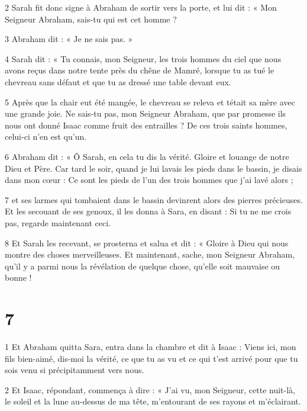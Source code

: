 \par 2 Sarah fit donc signe à Abraham de sortir vers la porte, et lui dit : « Mon Seigneur Abraham, sais-tu qui est cet homme ?

\par 3 Abraham dit : « Je ne sais pas. »

\par 4 Sarah dit : « Tu connais, mon Seigneur, les trois hommes du ciel que nous avons reçus dans notre tente près du chêne de Mamré, lorsque tu as tué le chevreau sans défaut et que tu as dressé une table devant eux.

\par 5 Après que la chair eut été mangée, le chevreau se releva et tétait sa mère avec une grande joie. Ne sais-tu pas, mon Seigneur Abraham, que par promesse ils nous ont donné Isaac comme fruit des entrailles ? De ces trois saints hommes, celui-ci n’en est qu’un.

\par 6 Abraham dit : « Ô Sarah, en cela tu dis la vérité. Gloire et louange de notre Dieu et Père. Car tard le soir, quand je lui lavais les pieds dans le bassin, je disais dans mon cœur : Ce sont les pieds de l'un des trois hommes que j'ai lavé alors ;

\par 7 et ses larmes qui tombaient dans le bassin devinrent alors des pierres précieuses. Et les secouant de ses genoux, il les donna à Sara, en disant : Si tu ne me crois pas, regarde maintenant ceci.

\par 8 Et Sarah les recevant, se prosterna et salua et dit : « Gloire à Dieu qui nous montre des choses merveilleuses. Et maintenant, sache, mon Seigneur Abraham, qu'il y a parmi nous la révélation de quelque chose, qu'elle soit mauvaise ou bonne !


\chapter{7}

\par 1 Et Abraham quitta Sara, entra dans la chambre et dit à Isaac : Viens ici, mon fils bien-aimé, dis-moi la vérité, ce que tu as vu et ce qui t'est arrivé pour que tu sois venu si précipitamment vers nous.

\par 2 Et Isaac, répondant, commença à dire : « J'ai vu, mon Seigneur, cette nuit-là, le soleil et la lune au-dessus de ma tête, m'entourant de ses rayons et m'éclairant.

